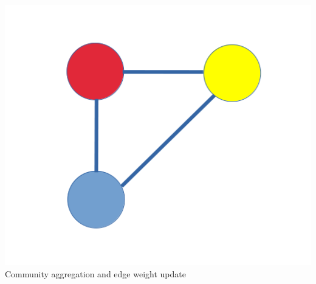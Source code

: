 \documentclass[aspectratio=1610]{beamer}
\begin{document}
\begin{frame}
\begin{columns}
        \begin{column}{0.33\textwidth}
            \includegraphics[width=\textwidth]{Louvain_Step3.png}
			Community aggregation and edge weight update
        \end{column}
    \end{columns}
\end{frame}
\end{document}
